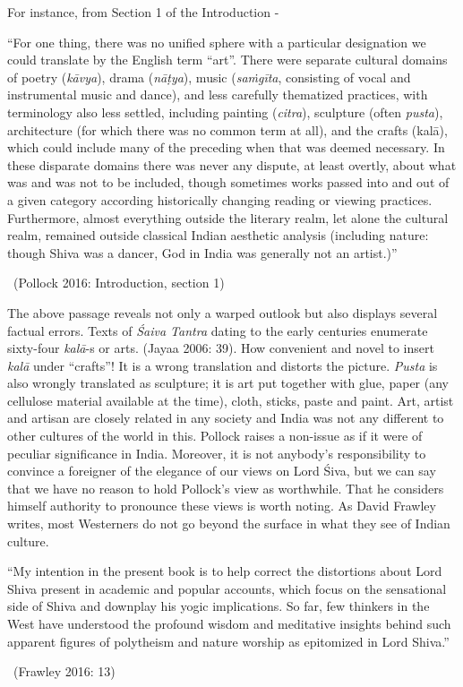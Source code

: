 For instance, from Section 1 of the Introduction -

\begin{myquote}
“For one thing, there was no unified sphere with a particular designation we could translate by the English term “art”. There were separate cultural domains of poetry (\textit{kāvya}), drama (\textit{nāṭya}), music (\textit{saṁgīta}, consisting of vocal and instrumental music and dance), and less carefully thematized practices, with terminology also less settled, including painting (\textit{citra}), sculpture (often \textit{pusta}), architecture (for which there was no common term at all), and the crafts (kalā), which could include many of the preceding when that was deemed necessary. In these disparate domains there was never any dispute, at least overtly, about what was and was not to be included, though sometimes works passed into and out of a given category according historically changing reading or viewing practices. Furthermore, almost everything outside the literary realm, let alone the cultural realm, remained outside classical Indian aesthetic analysis (including nature: though Shiva was a dancer, God in India was generally not an artist.)” 

~\hfill (Pollock 2016: Introduction, section 1)
\end{myquote}

The above passage reveals not only a warped outlook but also displays several factual errors. Texts of \textit{Śaiva Tantra} dating to the early centuries enumerate sixty-four \textit{kalā}-s or arts. (Jayaa 2006: 39). How convenient and novel to insert \textit{kalā} under “crafts”! It is a wrong translation and distorts the picture. \textit{Pusta} is also wrongly translated as sculpture; it is art put together with glue, paper (any cellulose material available at the time), cloth, sticks, paste and paint. Art, artist and artisan are closely related in any society and India was not any different to other cultures of the world in this. Pollock raises a non-issue as if it were of peculiar significance in India. Moreover, it is not anybody’s responsibility to convince a foreigner of the elegance of our views on Lord Śiva, but we can say that we have no reason to hold Pollock’s view as worthwhile. That he considers himself authority to pronounce these views is worth noting. As David Frawley writes, most Westerners do not go beyond the surface in what they see of Indian culture.

\begin{myquote}
“My intention in the present book is to help correct the distortions about Lord Shiva present in academic and popular accounts, which focus on the sensational side of Shiva and downplay his yogic implications. So far, few thinkers in the West have understood the profound wisdom and meditative insights behind such apparent figures of polytheism and nature worship as epitomized in Lord Shiva.” 

~\hfill (Frawley 2016: 13)
\end{myquote}

